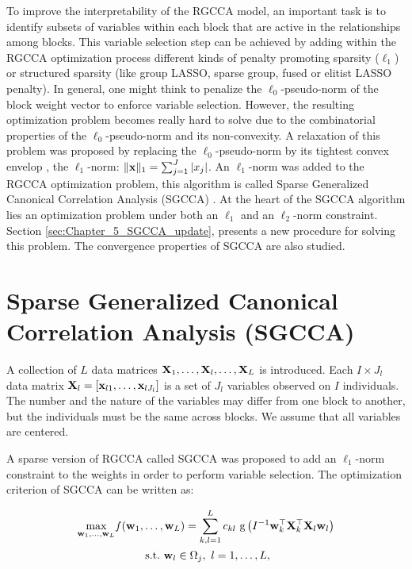 \documentclass[
]{jss}
\begin{document}
To improve the interpretability of the RGCCA model, an important task is
to identify subsets of variables within each block that are active in
the relationships among blocks. This variable selection step can be
achieved by adding within the RGCCA optimization process different kinds
of penalty promoting sparsity (\(\ell_1\)) or structured sparsity (like
group LASSO, sparse group, fused or elitist LASSO penalty). In general,
one might think to penalize the \(\ell_0\)-pseudo-norm of the block
weight vector to enforce variable selection. However, the resulting
optimization problem becomes really hard to solve due to the
combinatorial properties of the \(\ell_0\)-pseudo-norm and its
non-convexity. A relaxation of this problem was proposed by replacing
the \(\ell_0\)-pseudo-norm by its tightest convex envelop
\citep{Boyd2004}, the \(\ell_1\)-norm:
\(\Vert \mathbf{x} \Vert_1 = \sum_{j=1}^J \vert x_j\vert\). An \(\ell_1\)-norm
was added to the RGCCA optimization problem, this algorithm is called
Sparse Generalized Canonical Correlation Analysis (SGCCA)
\citep{Tenenhaus2014a}. At the heart of the SGCCA algorithm lies an
optimization problem under both an \(\ell_1\) and an \(\ell_2\)-norm
constraint. Section \ref{sec:Chapter_5_SGCCA_update}, presents a new
procedure for solving this problem. The convergence properties of SGCCA
are also studied.

\hypertarget{sparse-generalized-canonical-correlation-analysis-sgcca}{%
\section{Sparse Generalized Canonical Correlation Analysis
(SGCCA)}\label{sparse-generalized-canonical-correlation-analysis-sgcca}}

A collection of \(L\) data matrices \(\mathbf{X}_1, \ldots, \mathbf{X}_l, \ldots, \mathbf{X}_L\)
is introduced. Each \(I \times J_l\) data matrix
\(\mathbf{X}_l=[\mathbf{x}_{l1}, \ldots,\mathbf{x}_{lJ_l}]\) is a set of \(J_l\) variables
observed on \(I\) individuals. The number and the nature of the
variables may differ from one block to another, but the individuals must
be the same across blocks. We assume that all variables are centered.

A sparse version of RGCCA called SGCCA \citep{Tenenhaus2014a} was
proposed to add an \(\ell_1\)-norm constraint to the weights in order to
perform variable selection. The optimization criterion of SGCCA can be
written as:

\begin{equation}
    \begin{gathered}
        \underset{\mathbf{w}_1, \ldots,\mathbf{w}_L}{\text{max}} f(\mathbf{w}_1, \ldots,\mathbf{w}_L) = \sum_{\substack{k, l = 1}}^L c_{kl} \text{ g}\left(I^{-1}\mathbf{w}_k^\top \mathbf{X}_k ^\top \mathbf{X}_l \mathbf{w}_l \right)
        \\
        \text{~s.t.~} \mathbf{w}_l\in\Omega_j,~ l = 1, \ldots, L,
    \end{gathered}
    \label{eq:Chapter_5_sgcca_optim}
\end{equation}
\end{document}
